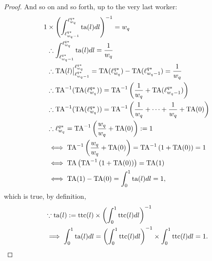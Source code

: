 \documentclass[hidelinks, nonatbib]{elsarticle}
\begin{document}
\begin{lemma}
\begin{proof}
        And so on and so forth, up to the very last worker:
        \begin{align}
        1 
        &\times 
        \left(
            \int_{\ell_{w_q - 1}^{q*}}^{\ell_{w_q}^{q*}}
            \text{ta}(l)
            dl
        \right) ^ {-1}
        =
        w_q
        \\
        &\therefore
        \int_{\ell_{w_q - 1}^{q*}}^{\ell_{w_q}^{q*}}
        \text{ta}(l)
        dl
        =
        \frac{1}{w_q}
        \\
        &\therefore
        \text{TA}(l)
        \big|_{\ell_{w_q - 1}^{q*}}^{\ell_{w_q}^{q*}}
        =
        \text{TA}(\ell_{w_q}^{q*})
        -
        \text{TA}(\ell_{w_q - 1}^{q*})
        =
        \frac{1}{w_q}
        \\
        &\therefore
        \text{TA}^{-1}(
            \text{TA}(\ell_{w_q}^{q*})
        )
        =
        \text{TA}^{-1}\left(
            \frac{1}{w_q}
            +
            \text{TA}(\ell_{w_q - 1}^{q*})
        \right)
        \\
        &\therefore
        \text{TA}^{-1}(
            \text{TA}(\ell_{w_q}^{q*})
        )
        =
        \text{TA}^{-1}\left(
            \frac{1}{w_q}
            +
            \dots
            +
            \frac{1}{w_q}
            +
            \text{TA}(0)
        \right)
        \\
        &\therefore
        \ell_{w_q}^{q*}
        =
        \text{TA}^{-1}\left(
            \frac{w_q}{w_q}
            +
            \text{TA}(0)
        \right)
        := 1
        \\
        &\iff
        \text{TA}^{-1}\left(
            \frac{w_q}{w_q}
            +
            \text{TA}(0)
        \right)
        =
        \text{TA}^{-1}\left(
            1
            +
            \text{TA}(0)
        \right)
        =
        1
        \\
        &\iff
        \text{TA}\left(
            \text{TA}^{-1}\left(
            1
            +
            \text{TA}(0)
        \right)
        \right)
        =
        \text{TA}(1)
        \\
        &\iff
        \text{TA}(1)
        -
        \text{TA}(0)
        =
        \int_{0}^{1}{
            \text{ta}(l)
            dl
        }
        =
        1
        ,
        \end{align}
        which is true, by definition,
        \begin{align}
        &\because
        \text{ta}(l) 
        :=
        \text{ttc}(l)
        \times
        \left(
            \int_{0}^{1}{
                \text{ttc}(l)
                dl
            }
        \right) ^ {-1}
        \\
        &\implies
        \int_{0}^{1}{
            \text{ta}(l)
            dl
        }
        =
        \left(
            \int_{0}^{1}
            \text{ttc}(l)
            dl
        \right) ^ {-1}
        \times
        \int_{0}^{1}{
            \text{ttc}(l)
            dl
        }
        =
        1
        .
        \end{align}
        

\end{proof}
\end{lemma}
\end{document}
